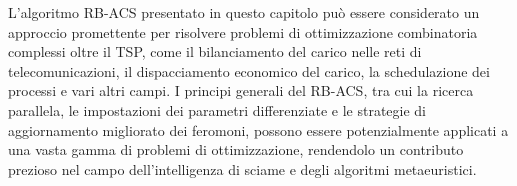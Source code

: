 
L'algoritmo \gls{RB-ACS} presentato in questo capitolo può essere considerato un approccio promettente per risolvere problemi di ottimizzazione combinatoria 
complessi oltre il  \gls{TSP}, come il bilanciamento del carico nelle reti di telecomunicazioni,
 il dispacciamento economico del carico, la schedulazione dei processi e vari altri campi. I principi generali del \gls{RB-ACS}, tra cui la ricerca parallela, le impostazioni dei parametri differenziate e le strategie di aggiornamento migliorato dei feromoni, possono essere potenzialmente applicati a una vasta gamma di problemi di ottimizzazione, rendendolo un contributo prezioso nel campo dell'intelligenza di sciame e degli algoritmi metaeuristici.

